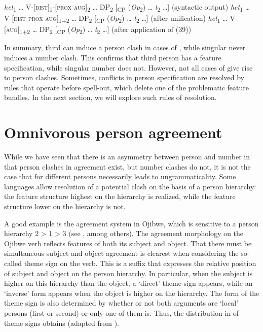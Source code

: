 \documentclass[output=paper]{langsci/langscibook}
\begin{document}
\ea \label{bkm:Ref295575416}  

\ea \textit{het}\textsubscript{1} … V-[\textsc{dist}]\textsubscript{1}{}-[\textsc{prox} \textsc{aug}]\textsubscript{2} … DP\textsubscript{2} [\textsubscript{CP} (\textit{Op}\textsubscript{2}) … \textit{t}\textsubscript{2} …]   (syntactic output)
\ex \textit{het}\textsubscript{1} … V-[\textsc{dist prox} \textsc{aug}]\textsubscript{1+2} … DP\textsubscript{2} [\textsubscript{CP} (\textit{Op}\textsubscript{2}) … \textit{t}\textsubscript{2} …]   (after unification)
\ex  \textit{het}\textsubscript{1} … V-[\textsc{aug}]\textsubscript{1+2} … DP\textsubscript{2} [\textsubscript{CP} (\textit{Op}\textsubscript{2}) … \textit{t}\textsubscript{2} …]     (after application of (39))
\z \z

In summary, third  can induce a person clash in cases of , while singular  never induces a number clash. This confirms that third person has a feature specification, while singular number does not. However, not all cases of  give rise to person clashes. Sometimes, conflicts in person specification are resolved by rules that operate before spell-out, which delete one of the problematic feature bundles. In the next section, we will explore such rules of resolution.

\section{Omnivorous person agreement}%

While we have seen that there is an asymmetry between person and number in that person clashes in agreement exist, but number clashes do not, it is not the case that  for different persons necessarily leads to ungrammaticality. Some languages allow resolution of a potential clash on the basis of a person hierarchy: the feature structure highest on the hierarchy is realized, while the feature structure lower on the hierarchy is not. 

  A good example is the agreement system in Ojibwe, which is sensitive to a person hierarchy 2 > 1 > 3 (see \citealt{Valentine2001}, among others). The agreement morphology on the Ojibwe verb reflects features of both its subject and object. That there must be simultaneous subject and object agreement is clearest when considering the so-called theme sign on the verb. This is a suffix that expresses the relative position of subject and object on the person hierarchy. In particular, when the subject is higher on this hierarchy than the object, a ‘direct’ theme-sign appears, while an ‘inverse’ form appears when the object is higher on the hierarchy. The form of the theme sign is also determined by whether or not both arguments are ‘local’ persons (first or second) or only one of them is. Thus, the distribution in  of theme signs obtains (adapted from \citealt{Lochbihler2008}).
\end{document}
